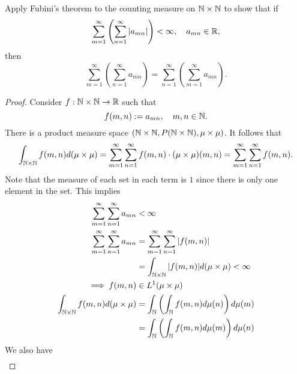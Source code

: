 \documentclass[class=book, crop=false]{standalone}
\begin{document}
        \begin{question}
             Apply Fubini’s theorem to the counting measure on $\mathbb{N} \times \mathbb{N}$ to show that if
             \begin{equation*}
                 \sum^{\infty}_{m = 1} \left(\sum^{\infty}_{n = 1} |a_{mn}|\right) < \infty, \quad a_{mn} \in \mathbb{R},
             \end{equation*}
             then
             \begin{equation*}
                 \sum^{\infty}_{m = 1} \left(\sum^{\infty}_{n = 1} a_{mn}\right) = \sum^{\infty}_{n = 1} \left(\sum^{\infty}_{m = 1} a_{mn}\right).
             \end{equation*}
        \end{question}
        \begin{proof}
            Consider $f: \mathbb{N} \times \mathbb{N} \rightarrow \mathbb{R}$ such that
            \begin{equation*}
                f(m, n) := a_{mn}, \quad m, n \in \mathbb{N}.
            \end{equation*}
            There is a product measure space $(\mathbb{N} \times \mathbb{N}, P(\mathbb{N} \times \mathbb{N}), \mu \times \mu)$. It follows that
            \begin{equation*}
                \int_{\mathbb{N} \times \mathbb{N}} f(m, n) d(\mu \times \mu) = \sum^{\infty}_{m = 1} \sum^{\infty}_{n = 1} f(m, n) \cdot (\mu \times \mu)(m, n) = \sum^{\infty}_{m = 1} \sum^{\infty}_{n = 1} f(m, n).
            \end{equation*}
            Note that the measure of each set in each term is $1$ since there is only one element in the set. This implies
            \begin{align*}
                \sum^{\infty}_{m = 1} \sum^{\infty}_{n = 1} a_{mn} &< \infty \\
                \sum^{\infty}_{m = 1} \sum^{\infty}_{n = 1} a_{mn} &= \sum^{\infty}_{m = 1} \sum^{\infty}_{n = 1} |f(m, n)| \\
                &= \int_{\mathbb{N} \times \mathbb{N}} |f(m, n)| d(\mu \times \mu) < \infty \\
                \implies f(m, n) &\in L^{1}(\mu \times \mu) \\
                \int_{\mathbb{N} \times \mathbb{N}} f(m, n) d(\mu \times \mu) &= \int_{\mathbb{N}} \left(\int_{\mathbb{N}} f(m, n) d\mu(n)\right) d\mu(m) \\
                &= \int_{\mathbb{N}} \left(\int_{\mathbb{N}} f(m, n) d\mu(m)\right) d\mu(n)
            \end{align*}
            We also have
            \begin{align*}

\end{align*}
\end{proof}
\end{document}
